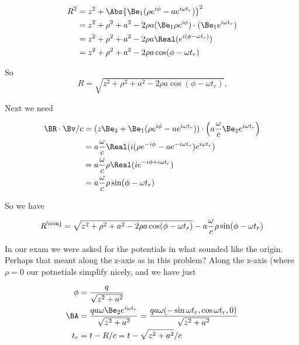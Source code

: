 \begin{align*}
R^2 
&= z^2 + \Abs{\Be_1 (\rho e^{i \phi} - a e^{i \omega t_r} )}^2 \\
&= z^2 + \rho^2 + a^2 - 2 \rho a (\Be_1 \rho e^{i \phi}) \cdot (\Be_1 e^{i \omega t_r}) \\
&= z^2 + \rho^2 + a^2 - 2 \rho a \Real( e^{ i(\phi - \omega t_r) } ) \\
&= z^2 + \rho^2 + a^2 - 2 \rho a \cos(\phi - \omega t_r)
\end{align*}

So
\begin{equation}\label{eqn:relativisticElectrodynamicsExamReflection:n}
R = \sqrt{z^2 + \rho^2 + a^2 - 2 \rho a \cos( \phi - \omega t_r ) }.
\end{equation}

Next we need

\begin{align*}
\BR \cdot \Bv/c
&= 
(z \Be_3 + \Be_1 (\rho e^{i \phi} - a e^{i \omega t_r} )) \cdot  
\left(a \frac{\omega}{c} \Be_2 e^{i \omega t_r} \right) \\
&=
a \frac{\omega }{c}
\Real(
i (\rho e^{-i \phi} - a e^{-i \omega t_r} ) e^{i \omega t_r} ) \\
&=
a \frac{\omega }{c}
\rho \Real( i e^{-i \phi + i \omega t_r} ) \\
&=
a \frac{\omega }{c}
\rho \sin(\phi - \omega t_r)
\end{align*}

So we have

\begin{equation}\label{eqn:relativisticElectrodynamicsExamReflection:n}
R^\conj = \sqrt{z^2 + \rho^2 + a^2 - 2 \rho a \cos( \phi - \omega t_r ) }
-a \frac{\omega }{c} \rho \sin(\phi - \omega t_r)
\end{equation}

In our exam we were asked for the potentials in what sounded like the origin.  Perhaps that meant along the z-axis as in this problem?  Along the z-axis (where $\rho = 0$ our potnetials simplify nicely, and we have just

\begin{align}\label{eqn:relativisticElectrodynamicsExamReflection:n}
\phi &= \frac{q}{\sqrt{z^2 + a^2}} \\
\BA 
&= 
\frac{q a \omega \Be_2 e^{i \omega t_r} }{\sqrt{z^2 + a^2}} 
= 
\frac{q a \omega (-\sin \omega t_r, \cos\omega t_r, 0)}{\sqrt{z^2 + a^2}} \\
t_r &= t - R/c = t - \sqrt{z^2 + a^2}/c
\end{align}

